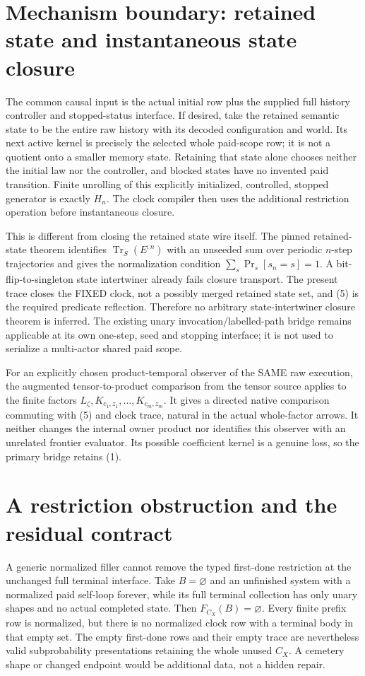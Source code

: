 \documentclass[11pt]{article}\usepackage{amsmath,amssymb,amsthm,geometry}\geometry{margin=1in}\newtheorem{definition}{Definition}\newtheorem{theorem}[definition]{Theorem}\newtheorem{proposition}[definition]{Proposition}
\begin{document}
\section{Mechanism boundary: retained state and instantaneous state closure}
The common causal input is the actual initial row plus the supplied full history controller and stopped-status interface. If desired, take the retained semantic state to be the entire raw history with its decoded configuration and world. Its next active kernel is precisely the selected whole paid-scope row; it is not a quotient onto a smaller memory state. Retaining that state alone chooses neither the initial law nor the controller, and blocked states have no invented paid transition. Finite unrolling of this explicitly initialized, controlled, stopped generator is exactly $H_n$. The clock compiler then uses the additional restriction operation before instantaneous closure.

This is different from closing the retained state wire itself. The pinned retained-state theorem identifies $\operatorname{Tr}_S(E^{;n})$ with an unseeded sum over periodic $n$-step trajectories and gives the normalization condition $\sum_s\Pr_s[s_n=s]=1$. A bit-flip-to-singleton state intertwiner already fails closure transport. The present trace closes the FIXED clock, not a possibly merged retained state set, and (5) is the required predicate reflection. Therefore no arbitrary state-intertwiner closure theorem is inferred. The existing unary invocation/labelled-path bridge remains applicable at its own one-step, seed and stopping interface; it is not used to serialize a multi-actor shared paid scope.

For an explicitly chosen product-temporal observer of the SAME raw execution, the augmented tensor-to-product comparison from the tensor source applies to the finite factors $L_\zeta,K_{c_1,z_1},\ldots,K_{c_m,z_m}$. It gives a directed native comparison commuting with (5) and clock trace, natural in the actual whole-factor arrows. It neither changes the internal owner product nor identifies this observer with an unrelated frontier evaluator. Its possible coefficient kernel is a genuine loss, so the primary bridge retains (1).

\section{A restriction obstruction and the residual contract}
A generic normalized filler cannot remove the typed first-done restriction at the unchanged full terminal interface. Take $B=\varnothing$ and an unfinished system with a normalized paid self-loop forever, while its full terminal collection has only unary shapes and no actual completed state. Then $F_{C_X}(B)=\varnothing$. Every finite prefix row is normalized, but there is no normalized clock row with a terminal body in that empty set. The empty first-done rows and their empty trace are nevertheless valid subprobability presentations retaining the whole unused $C_X$. A cemetery shape or changed endpoint would be additional data, not a hidden repair.
\end{document}
